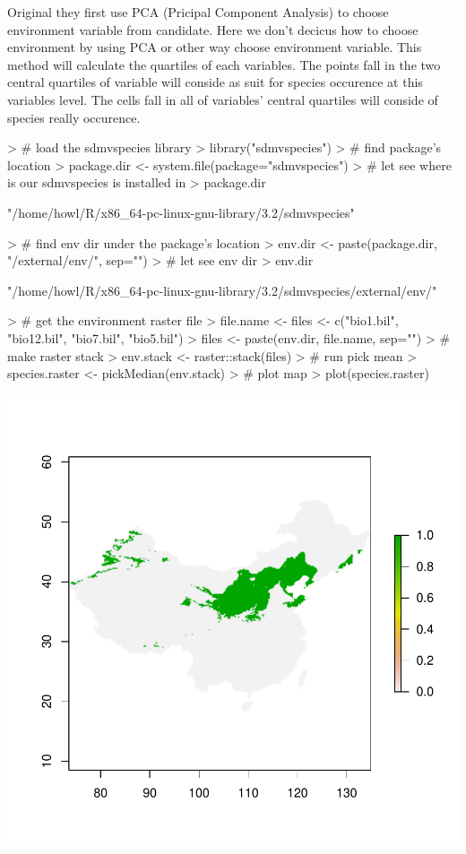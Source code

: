 \documentclass{report}
\begin{document}
Original they first use PCA (Pricipal Component Analysis) to choose environment variable from candidate.
Here we don't decicus how to choose environment by using PCA or other way choose environment variable.
This method will calculate the quartiles of each variables. The points fall in the two central quartiles of variable will conside as suit for species
occurence at this variables level. The cells fall in all of variables' central quartiles will conside of species really occurence.
\begin{Schunk}
\begin{Sinput}
> # load the sdmvspecies library
> library("sdmvspecies")
> # find package's location
> package.dir <- system.file(package="sdmvspecies")
> # let see where is our sdmvspecies is installed in
> package.dir
\end{Sinput}
\begin{Soutput}
[1] "/home/howl/R/x86_64-pc-linux-gnu-library/3.2/sdmvspecies"
\end{Soutput}
\begin{Sinput}
> # find env dir under the package's location
> env.dir <- paste(package.dir, "/external/env/", sep="")
> # let see env dir
> env.dir
\end{Sinput}
\begin{Soutput}
[1] "/home/howl/R/x86_64-pc-linux-gnu-library/3.2/sdmvspecies/external/env/"
\end{Soutput}
\begin{Sinput}
> # get the environment raster file
> file.name <- files <- c("bio1.bil", "bio12.bil", "bio7.bil", "bio5.bil")
> files <- paste(env.dir, file.name, sep="")
> # make raster stack
> env.stack <- raster::stack(files)
> # run pick mean
> species.raster <- pickMedian(env.stack)
> # plot map
> plot(species.raster)
\end{Sinput}
\end{Schunk}
\includegraphics{sdmvspecies-pick_median_method}
\end{document}
